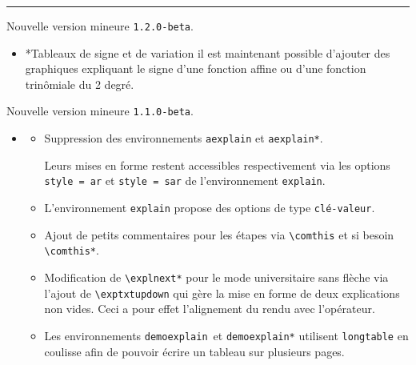 \documentclass[12pt,a4paper]{book}
\makeatletter
\newcommand\env[1]{\texttt{#1}}
\newcommand\macro[1]{\env{\textbackslash{}#1}}
\theoremstyle{definition}
\newcommand\separation{
	\medskip
	\hfill\rule{0.5\textwidth}{0.75pt}\hfill
	\medskip
}
\newcommand\topic{\@ifstar{\@topic@star}{\@topic@no@star}}
\newcommand\@topic@no@star[1]{%
	\textbf{\textsc{#1}.}%
}
\newcommand\@topic@star[1]{%
	\textbf{\textsc{#1} :}%
}
\makeatother
\begin{document}
{{\begin{description}
    
    \separation


    \medskip
    \item[2020-07-05] Nouvelle version mineure \verb+1.2.0-beta+.
    
    \begin{itemize}[itemsep=.5em]
        \item \topic*{Tableaux de signe et de variation}
              il est maintenant possible d'ajouter des graphiques expliquant le signe d'une fonction affine ou d'une fonction trinômiale du 2\ieme{} degré.
    \end{itemize}

    \medskip
    \item[2020-06-27] Nouvelle version mineure \verb+1.1.0-beta+.
    
    \begin{itemize}[itemsep=.5em]
        \item \topic{Logique}
        \begin{itemize}[itemsep=.5em]
            \item Suppression des environnements \env{aexplain} et \env{aexplain*}.
    
                  \smallskip
    
                  Leurs mises en forme restent accessibles respectivement via les options \verb+style = ar+ et \verb+style = sar+ de l'environnement \env{explain}.
    
    
            \item L'environnement \env{explain} propose des options de type \texttt{clé-valeur}.
    
    
            \item Ajout de petits commentaires pour les étapes via \macro{comthis} et si besoin \macro{comthis*}.
    
    
            \item Modification de \macro{explnext*} pour le mode universitaire sans flèche via l'ajout de \macro{exptxtupdown} qui gère la mise en forme de deux explications non vides.
                  Ceci a pour effet l'alignement du rendu avec l'opérateur.
    
    
            \item Les environnements \env{demoexplain} et \env{demoexplain*} utilisent \env{longtable} en coulisse afin de pouvoir écrire un tableau sur plusieurs pages.
        \end{itemize}
    \end{itemize}


\end{description}}}
\end{document}

